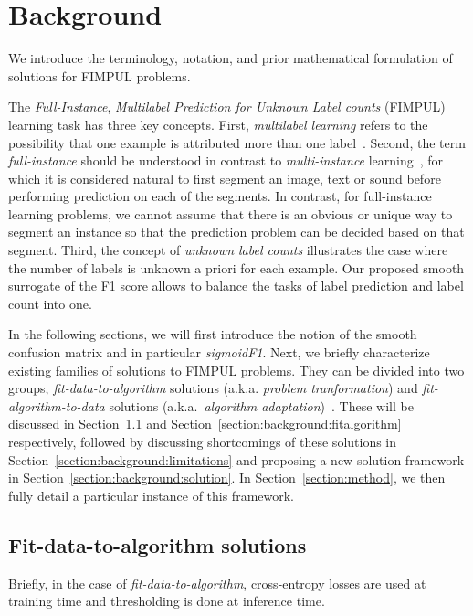 
\section{Background}
\label{section:background}

We introduce the terminology, notation, and prior mathematical formulation of solutions for FIMPUL problems.

The \emph{Full-Instance}, \emph{Multilabel Prediction for Unknown Label counts} (FIMPUL) learning task has three key concepts.
First, \emph{multilabel learning} refers to the possibility that one example is attributed more than one label~\cite{multilabelMethods}.
Second, the term \emph{full-instance} should be understood in contrast to \emph{multi-instance} learning~\citep[e.g.,][]{multiInstance,multiInstanceMultiLabel}, for which it is considered natural to first segment an image, text or sound before performing prediction on each of the segments. In contrast, for full-instance learning problems, we cannot assume that there is an obvious or unique way to segment an instance so that the prediction problem can be decided based on that segment.
Third, the concept of \emph{unknown label counts} illustrates the case where the number of labels is unknown a priori for each example. Our proposed smooth surrogate of the F1 score allows to balance the tasks of label prediction and label count into one.

In the following sections, we will first introduce the notion of the smooth confusion matrix and in particular \emph{sigmoidF1}.
Next, we briefly characterize existing families of solutions to FIMPUL problems.
They can be divided into two groups, \emph{fit-data-to-algorithm} solutions (a.k.a. \emph{problem tranformation}) and \emph{fit-algorithm-to-data} solutions (a.k.a.\ \emph{algorithm adaptation})~\cite{multilabelReview, multilabelReview2}. These will be discussed in Section~\ref{section:background:fitdata} and Section~\ref{section:background:fitalgorithm} respectively, followed by discussing shortcomings of these solutions in Section~\ref{section:background:limitations} and proposing a new solution framework in Section~\ref{section:background:solution}.
In Section~\ref{section:method}, we then fully detail a particular instance of this framework.

\subsection{Fit-data-to-algorithm solutions}
\label{section:background:fitdata}
Briefly, in the case of \emph{fit-data-to-algorithm}, cross-entropy losses are used at training time and thresholding is done at inference time.

